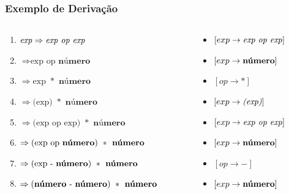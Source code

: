 \documentclass[table]{beamer}
\begin{document}
\begin{frame}
   \frametitle{Exemplo de Derivação}
   \footnotesize
   \begin{columns}
   \begin{column}{0.6\textwidth}
      \begin{enumerate}
         \item $\text{\textit{exp}} \Rightarrow \textit{exp op exp}$
	 \item \hspace{0.55cm} $\Rightarrow \text{exp op } \textbf{número}$
	 \item \hspace{0.55cm} $\Rightarrow \text{exp } * \textbf{ número}$
	 \item \hspace{0.55cm} $\Rightarrow \text{(exp) } * \textbf{ número}$
	 \item \hspace{0.55cm} $\Rightarrow \text{(exp op exp) } * \textbf{ número}$
	 \item \hspace{0.55cm} $\Rightarrow \text{(exp op \textbf{número}) } * \textbf{ número}$
	 \item \hspace{0.55cm} $\Rightarrow \text{(exp - \textbf{número}) } * \textbf{ número}$
	 \item \hspace{0.55cm} $\Rightarrow \text{(\textbf{número} - \textbf{número}) } * \textbf{ número}$
      \end{enumerate}
   \end{column}
   \begin{column}{0.4\textwidth}
      \begin{itemize}
          \item[] $[exp \to \text{\textit{exp op exp}}]$
          \item[] $[exp \to \text{\textbf{número}}]$
          \item[] $[op  \to *]$ 
          \item[] $[exp \to \text{\textit{(exp)}}]$ 
          \item[] $[exp \to \text{\textit{exp op exp}}]$ 
          \item[] $[exp \to \text{\textbf{número}}]$
          \item[] $[op  \to -]$ 
          \item[] $[exp \to \text{\textbf{número}}]$ 
      \end{itemize}
   \end{column}
   \end{columns}
\end{frame}
\end{document}
